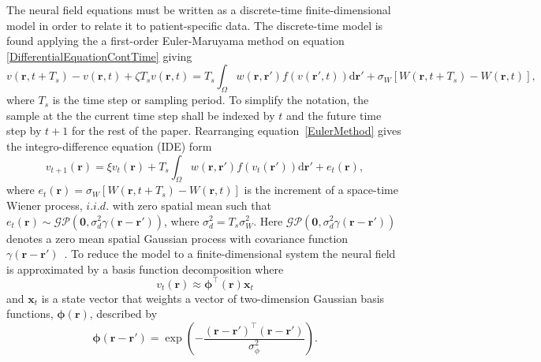 \documentclass[]{article}
\begin{document}
The neural field equations must be written as a discrete-time finite-dimensional model in order to relate it to patient-specific data. The discrete-time model is found applying the a first-order Euler-Maruyama method on equation \ref{DifferentialEquationContTime} giving
\begin{equation}\label{EulerMethod}
	v\left( \mathbf{r},t+T_s \right)-v\left( \mathbf{r},t \right) + \zeta T_sv\left(\mathbf{r},t \right) = T_s\int_\Omega {w\left( \mathbf{r},\mathbf{r}' \right) f\left( {v\left( \mathbf{r}',t \right)}\right)\textrm{d}\mathbf{r}'} + 	\sigma_W[W\left( \mathbf{r},t+T_s \right)-W\left( \mathbf{r},t \right)],
\end{equation}
where $T_s$ is the time step or sampling period. To simplify the notation, the sample at the the current time step shall be indexed by $t$ and the future time step by $t+1$ for the rest of the paper. Rearranging equation~\ref{EulerMethod} gives the integro-difference equation (IDE) form
\begin{equation}
	\label{NoisyDiscreteTimeModel} 
	v_{t+1}\left(\mathbf{r}\right) = 
	\xi v_t\left(\mathbf{r}\right) + 
	T_s \int_\Omega { 
	    w\left(\mathbf{r},\mathbf{r}'\right)
	    f\left(v_t\left(\mathbf{r}'\right)\right) 
	\textrm{d}\mathbf{r}'} 
	+ e_t\left(\mathbf{r}\right), 
\end{equation}
where $e_t(\mathbf{r}) = \sigma_W[W\left( \mathbf{r},t+T_s \right)-W\left( \mathbf{r},t \right)]$ is the increment of a space-time Wiener process, $i.i.d.$ with zero spatial mean such that $e_t(\mathbf{r})\sim\mathcal{GP}(\mathbf 0,\sigma_d^2\gamma(\mathbf{r}-\mathbf{r}'))$, where $\sigma_d^2=T_s\sigma_W^2$. Here $\mathcal{GP}(\mathbf 0,\sigma_d^2\gamma(\mathbf{r}-\mathbf{r}'))$ denotes a zero mean spatial Gaussian process with covariance function $\gamma(\mathbf{r}-\mathbf{r}')$~\cite{Rasmussen2005}.
To reduce the model to a finite-dimensional system the neural field is approximated by a basis function decomposition where
\begin{equation}
	\label{DefFieldDecomp} v_t\left(\mathbf{r}\right) \approx \boldsymbol{\phi}^{\top}\left(\mathbf{r}\right) \mathbf{x}_t 
\end{equation}
and $\mathbf{x}_t$ is a state vector that weights a vector of two-dimension Gaussian basis functions, $\boldsymbol{\phi}(\mathbf{r})$, described by
\begin{equation}\label{eq:FieldBasisFunction}
	\boldsymbol\phi\left(\mathbf{r}-\mathbf{r}'\right) =
\exp{\left(-\frac{(\mathbf{r}-\mathbf{r}')^\top(\mathbf{r}-\mathbf{r}')}{\sigma_{\phi}^2}\right)}. 
\end{equation}
\end{document}
